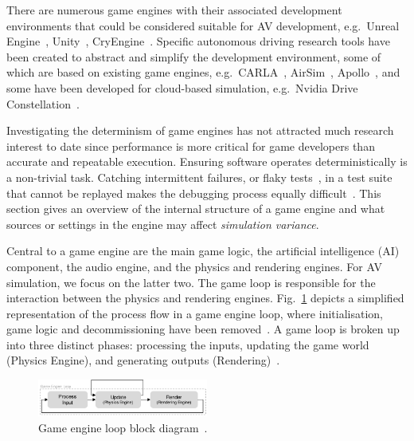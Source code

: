 There are numerous game engines with their associated development environments that could be considered suitable for AV development, e.g.\ Unreal Engine~\cite{UE4_main_website}, Unity~\cite{Unity_main_website}, CryEngine~\cite{CryEngine_main_website}. Specific autonomous driving research tools have been created to abstract and simplify the development environment, some of which are based on existing game engines, e.g.\ CARLA~\cite{carla_main_website}, AirSim~\cite{AirSim_main_website}, Apollo~\cite{Apollo_main_website}, and some have been developed for cloud-based simulation, e.g.\ Nvidia Drive Constellation~\cite{nvidia_constellation}.

Investigating the determinism of game engines has not attracted much research interest to date since performance is more critical for game developers than accurate and repeatable execution. Ensuring software operates deterministically is a non-trivial task.  Catching intermittent failures, or flaky tests~\cite{intermittently-failing-tests}, in a test suite that cannot be replayed makes the debugging process equally difficult~\cite{acm-q-rr-interview}. This section gives an overview of the internal structure of a game engine and what sources or settings in the engine may affect \textit{simulation variance}.

Central to a game engine are the main game logic, the artificial intelligence (AI) component, the audio engine, and the physics and rendering engines. For AV simulation, we focus on the latter two. The game loop is responsible for the interaction between the physics and rendering engines. Fig.~\ref{GameEngineLoopDiagram} depicts a simplified representation of the process flow in a game engine loop, where  initialisation, game logic and decommissioning have been removed~\cite{unity_event_execution}. A game loop is broken up into three distinct phases: processing the inputs, updating the game world (Physics Engine), and generating outputs (Rendering)~\cite{GameEngineArchBook}.

\begin{figure}[h]
\centering
\includegraphics[width=0.5\textwidth]{../other/figures/GameEngineLoopv2.pdf}
\caption{Game engine loop block diagram~\cite{GameProgPatternsBook}.}
\label{GameEngineLoopDiagram}
\end{figure}

